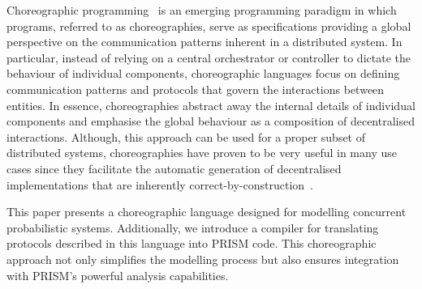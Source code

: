 Choreographic programming~\cite{M23} is an emerging programming
paradigm in which programs, referred to as choreographies, serve as
specifications providing a global perspective on the communication
patterns inherent in a distributed system. 
%
In particular, instead of relying on a central orchestrator or
controller to dictate the behaviour of individual components,
choreographic languages focus on defining communication patterns and
protocols that govern the interactions between entities.
%
In essence, choreographies abstract away the internal details of
individual components and emphasise the global behaviour as a
composition of decentralised interactions. %
%
%
Although, this approach can be used for a proper subset of distributed
systems, choreographies have proven to be very useful in many use
cases since they facilitate the automatic generation of decentralised
implementations that are inherently
correct-by-construction~\cite{CM13}.
%

This paper presents a choreographic language designed for modelling
concurrent probabilistic systems.
Additionally, we introduce a compiler for translating protocols
described in this language into PRISM code. This choreographic
approach not only simplifies the modelling process but also ensures
integration with PRISM's powerful analysis capabilities.

